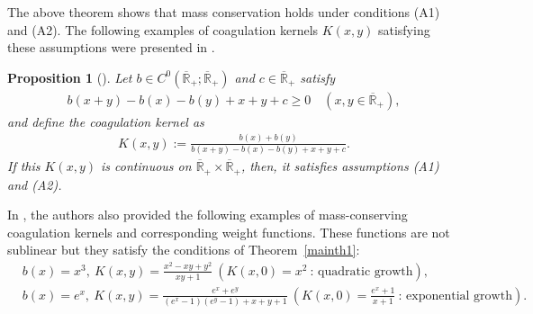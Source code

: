 \documentclass[a4paper,11pt]{article}
\newtheorem{prop}[thm]{Proposition}
\def\Rb{\overline{{\mathbb R}}_+}
\begin{document}
The above theorem shows that mass conservation holds under conditions (A1) and (A2). The following examples of coagulation kernels $K(x,y)$ satisfying these assumptions were presented in \cite{I-K-M2023}.
\begin{prop}[\cite{I-K-M2023}] Let $b\in C^0(\Rb;\Rb)$ and $c\in\Rb$ satisfy
\begin{align*}
b(x+y)-b(x)-b(y)+x+y+c\ge 0\quad (x,y\in\Rb),
\end{align*}
and define the coagulation kernel as
\begin{align*}
    K(x,y):=\frac{b(x)+b(y)}{b(x+y)-b(x)-b(y)+x+y+c}.
\end{align*}
If this $K(x,y)$ is continuous on $\Rb\times \Rb$,
then, it satisfies assumptions (A1) and (A2). 
\end{prop}
In \cite{I-K-M2023}, the authors also provided the following examples of mass-conserving coagulation kernels and corresponding weight functions. These functions are not sublinear but they satisfy the conditions of Theorem~\ref{mainth1}:
\begin{align*}
&b(x)=x^3,~K(x,y)=\frac{x^2-xy+y^2}{xy+1}~\left(K(x,0)=x^2~\text{:~quadratic growth}\right),\\
&b(x)=e^x,~K(x,y)=\frac{e^x+e^y}{(e^x-1)(e^y-1)+x+y+1}~\left(K(x,0)=\frac{e^x+1}{x+1}~\text{:~exponential growth}\right).
\end{align*}
\end{document}

